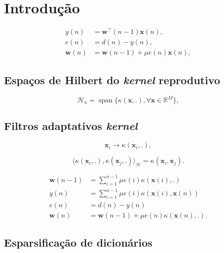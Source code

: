 \chapter{Introdução} \label{cap:introducao}

\begin{align}
    y(n) &= \mathbf{w}^{\top}(n-1)\mathbf{x}(n),\\
    e(n) &= d(n) - y(n),\\
    \mathbf{w}(n) &= \mathbf{w}(n-1) + \mu e(n)\mathbf{x}(n),
\end{align}

\section{Espaços de Hilbert do \textit{kernel} reprodutivo}

\begin{equation}
    \mathcal{H}_{\kappa} = \operatorname{span}\{\kappa(\mathbf{x},.), \forall \mathbf{x}\in \mathbb{R}^M\},
\end{equation}

\section{Filtros adaptativos \textit{kernel}}

\begin{equation}
    \mathbf{x}_i \rightarrow \kappa(\mathbf{x}_i,.),
\end{equation}


\begin{equation}
    \langle \kappa(\mathbf{x}_i,.), \kappa(\mathbf{x}_j,.) \rangle_{\mathcal{H}} = \kappa(\mathbf{x}_i, \mathbf{x}_j).
\end{equation}

\begin{align}
    \mathbf{w}(n-1) &= \sum_{i=1}^{n-1}\mu e(i)\kappa(\mathbf{x}(i),.)\label{eq:klms_w}\\
    y(n) &= \sum_{i=1}^{n-1}\mu e(i)\kappa(\mathbf{x}(i),\mathbf{x}(n))\label{eq:klms_y}\\
    e(n) &= d(n) - y(n)\\
    \mathbf{w}(n) &= \mathbf{w}(n-1) +\mu e(n)\kappa(\mathbf{x}(n),.).
\end{align}

\section{Esparsificação de dicionários}

